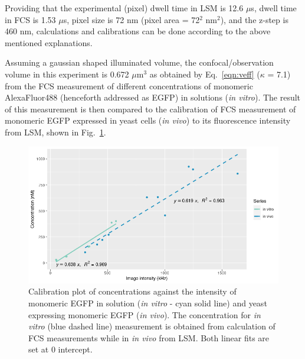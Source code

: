 Providing that the experimental (pixel) dwell time in LSM is 12.6 $\mu$s, dwell time in FCS is 1.53 $\mu$s, pixel size is 72 nm (pixel area = 72$^{2}$ nm$^{2}$), and the z-step is 460 nm, calculations and calibrations can be done according to the above mentioned explanations.

Assuming a gaussian shaped illuminated volume, the confocal/observation volume in this experiment is 0.672 $\mu$m$^{3}$ as obtained by Eq.~\ref{eqn:veff} ($\kappa$ = 7.1) from the FCS measurement of different concentrations of monomeric AlexaFluor488 (henceforth addressed as EGFP) in solutions (\textit{in vitro}). 
The result of this measurement is then compared to the calibration of FCS measurement of monomeric EGFP expressed in yeast cells (\textit{in vivo}) to its fluorescence intensity from LSM, shown in Fig.~\ref{fig:monogfp}.  


\begin{figure}[!h]
\centering
\includegraphics[width=0.9\columnwidth]{Exp_9_FCS/Figures/Calplot}
\caption{Calibration plot of concentrations against the intensity of monomeric EGFP in solution (\textit{in vitro} - cyan solid line) and yeast expressing monomeric EGFP (\textit{in vivo}). The concentration for \textit{in vitro} (blue dashed line) measurement is obtained from calculation of FCS measurements while in \textit{in vivo} from LSM. 
Both linear fits are set at 0 intercept.}
\label{fig:monogfp}
\end{figure}

